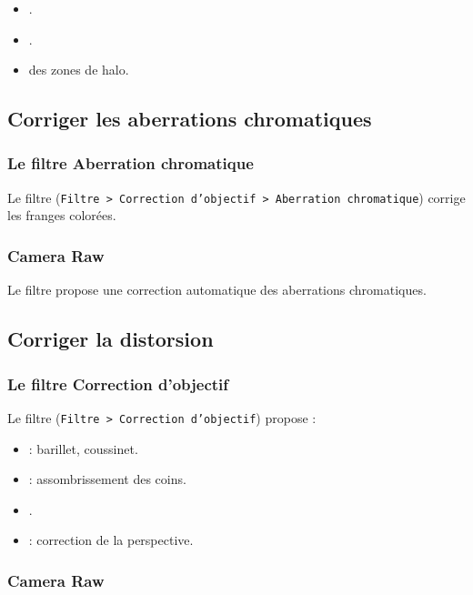 \begin{itemize}
    \item {}.
    \item {}.
    \item {} des zones de halo.
\end{itemize}

\subsection{Corriger les aberrations chromatiques}

\subsubsection{Le filtre Aberration chromatique}

Le filtre  (\texttt{Filtre > Correction d'objectif > Aberration chromatique}) corrige les franges colorées.

\subsubsection{Camera Raw}

Le filtre  propose une correction automatique des aberrations chromatiques.

\subsection{Corriger la distorsion}

\subsubsection{Le filtre Correction d'objectif}

Le filtre  (\texttt{Filtre > Correction d'objectif}) propose :

\begin{itemize}
    \item {} : barillet, coussinet.
    \item {} : assombrissement des coins.
    \item {}.
    \item {} : correction de la perspective.
\end{itemize}

\subsubsection{Camera Raw}


